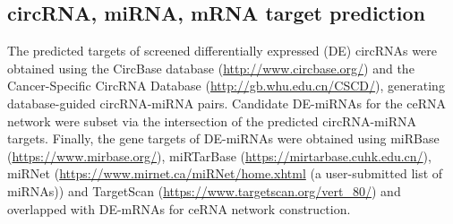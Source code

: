 \documentclass[twocolumn]{bmcart}%
\begin{document}
\subsection*{\textbf{circRNA, miRNA, mRNA target prediction }}
 
The predicted targets of screened differentially expressed (DE) circRNAs were obtained using the CircBase database \cite{Glazar2014Nov} (\url{http://www.circbase.org/}) and the Cancer-Specific CircRNA Database \cite{Xia2018Jan} (\url{http://gb.whu.edu.cn/CSCD/}), generating database-guided circRNA-miRNA pairs. Candidate DE-miRNAs for the ceRNA network were subset via the intersection of the predicted circRNA-miRNA targets. Finally, the gene targets of DE-miRNAs were obtained using miRBase \cite{Kozomara2019Jan} (\url{https://www.mirbase.org/}), miRTarBase \cite{Hsu2011Jan} (\url{https://mirtarbase.cuhk.edu.cn/}), miRNet \cite{Chang2020Jul} (\url{https://www.mirnet.ca/miRNet/home.xhtml} (a user-submitted list of miRNAs)) and TargetScan \cite{Targetscan} (\url{https://www.targetscan.org/vert_80/}) and overlapped with DE-mRNAs for ceRNA network construction.
\end{document}
